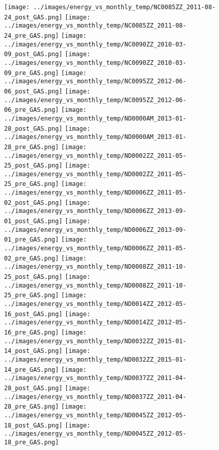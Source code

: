\clearpage
\begin{figure}
\centering
\texttt{[image: ../images/energy\_vs\_monthly\_temp/NC0085ZZ\_2011-08-24\_post\_GAS.png]}
\texttt{[image: ../images/energy\_vs\_monthly\_temp/NC0085ZZ\_2011-08-24\_pre\_GAS.png]}
\texttt{[image: ../images/energy\_vs\_monthly\_temp/NC0090ZZ\_2010-03-09\_post\_GAS.png]}
\texttt{[image: ../images/energy\_vs\_monthly\_temp/NC0090ZZ\_2010-03-09\_pre\_GAS.png]}
\texttt{[image: ../images/energy\_vs\_monthly\_temp/NC0095ZZ\_2012-06-06\_post\_GAS.png]}
\texttt{[image: ../images/energy\_vs\_monthly\_temp/NC0095ZZ\_2012-06-06\_pre\_GAS.png]}
\texttt{[image: ../images/energy\_vs\_monthly\_temp/ND0000AM\_2013-01-28\_post\_GAS.png]}
\texttt{[image: ../images/energy\_vs\_monthly\_temp/ND0000AM\_2013-01-28\_pre\_GAS.png]}
\texttt{[image: ../images/energy\_vs\_monthly\_temp/ND0002ZZ\_2011-05-25\_post\_GAS.png]}
\texttt{[image: ../images/energy\_vs\_monthly\_temp/ND0002ZZ\_2011-05-25\_pre\_GAS.png]}
\texttt{[image: ../images/energy\_vs\_monthly\_temp/ND0006ZZ\_2011-05-02\_post\_GAS.png]}
\texttt{[image: ../images/energy\_vs\_monthly\_temp/ND0006ZZ\_2013-09-01\_post\_GAS.png]}
\texttt{[image: ../images/energy\_vs\_monthly\_temp/ND0006ZZ\_2013-09-01\_pre\_GAS.png]}
\texttt{[image: ../images/energy\_vs\_monthly\_temp/ND0006ZZ\_2011-05-02\_pre\_GAS.png]}
\texttt{[image: ../images/energy\_vs\_monthly\_temp/ND0008ZZ\_2011-10-25\_post\_GAS.png]}
\texttt{[image: ../images/energy\_vs\_monthly\_temp/ND0008ZZ\_2011-10-25\_pre\_GAS.png]}
\texttt{[image: ../images/energy\_vs\_monthly\_temp/ND0014ZZ\_2012-05-16\_post\_GAS.png]}
\texttt{[image: ../images/energy\_vs\_monthly\_temp/ND0014ZZ\_2012-05-16\_pre\_GAS.png]}
\texttt{[image: ../images/energy\_vs\_monthly\_temp/ND0032ZZ\_2015-01-14\_post\_GAS.png]}
\texttt{[image: ../images/energy\_vs\_monthly\_temp/ND0032ZZ\_2015-01-14\_pre\_GAS.png]}
\texttt{[image: ../images/energy\_vs\_monthly\_temp/ND0037ZZ\_2011-04-28\_post\_GAS.png]}
\texttt{[image: ../images/energy\_vs\_monthly\_temp/ND0037ZZ\_2011-04-28\_pre\_GAS.png]}
\texttt{[image: ../images/energy\_vs\_monthly\_temp/ND0045ZZ\_2012-05-18\_post\_GAS.png]}
\texttt{[image: ../images/energy\_vs\_monthly\_temp/ND0045ZZ\_2012-05-18\_pre\_GAS.png]}
\end{figure}
